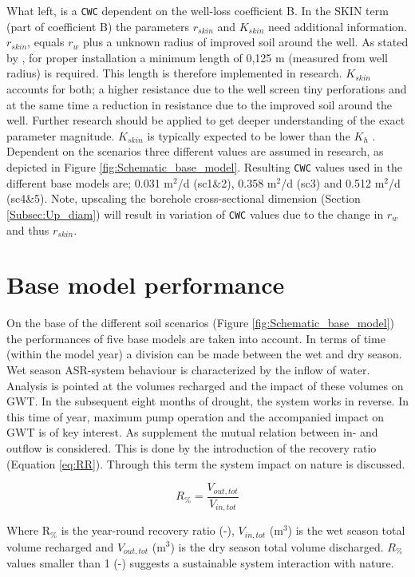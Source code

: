 What left, is a \texttt{CWC} dependent on the well-loss coefficient B. In the SKIN term (part of coefficient B) the parameters $r_{skin}$ and $K_{skin}$ need additional information. $r_{skin}$, equals $r_{w}$ plus a unknown radius of improved soil around the well. As stated by \citep{Bot2016}, for proper installation a minimum length of 0,125 m (measured from well radius) is required. This length is therefore implemented in research. $K_{skin}$ accounts for both; a higher resistance due to the well screen tiny perforations and at the same time a reduction in resistance due to the improved soil around the well. Further research should be applied to get deeper understanding of the exact parameter magnitude. $K_{skin}$ is typically expected to be lower than the $K_{h}$ \citep{LeonardF.KonikowGeorgeZ.HornbergerKeithJ.Halford2009}. Dependent on the scenarios three different values are assumed in research, as depicted in Figure \ref{fig:Schematic_base_model}. Resulting \texttt{CWC} values used in the different base models are; 0.031 m$^2$/d (sc1\&2), 0.358 m$^2$/d (sc3) and 0.512 m$^2$/d (sc4\&5). Note, upscaling the borehole cross-sectional dimension (Section \ref{Subsec:Up_diam}) will result in variation of \texttt{CWC} values due to the change in $r_{w}$ and thus $r_{skin}$. 

\section{Base model performance}
\label{section:Base_model_perf}
On the base of the different soil scenarios (Figure \ref{fig:Schematic_base_model}) the performances of five base models are taken into account. In terms of time (within the model year) a division can be made between the wet and dry season. Wet season ASR-system behaviour is characterized by the inflow of water. Analysis is pointed at the volumes recharged and the impact of these volumes on GWT. In the subsequent eight months of drought, the system works in reverse. In this time of year, maximum pump operation and the accompanied impact on GWT is of key interest. As supplement the mutual relation between in- and outflow is considered. This is done by the introduction of the recovery ratio (Equation \ref{eq:RR}). Through this term the system impact on nature is discussed.  

\begin{equation}
 R_{\%} = \frac{V_{out,tot}}{V_{in,tot}}
\label{eq:RR}
\end{equation}

Where  R$_{\%}$ is the year-round recovery ratio (-), $V_{in,tot}$ (m$^3$) is the wet season total volume recharged and $V_{out,tot}$ (m$^3$) is the dry season total volume discharged. $R_{\%}$ values smaller than 1 (-) suggests a sustainable system interaction with nature.  \\

